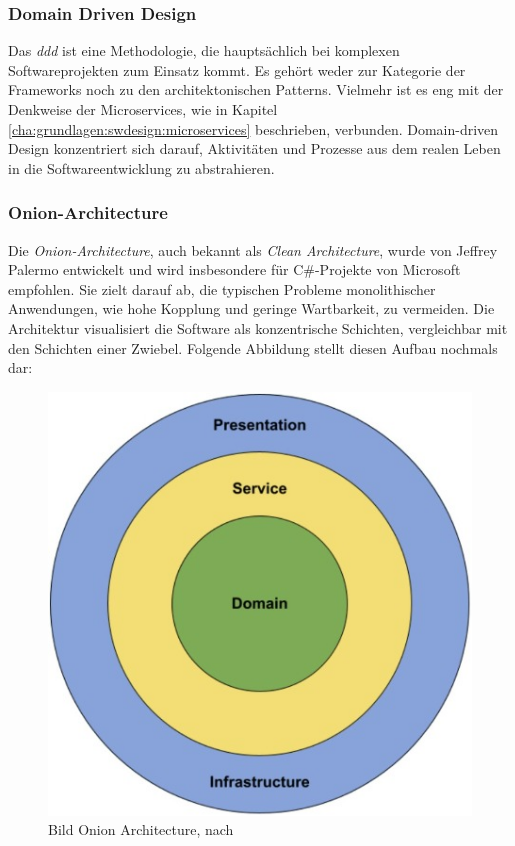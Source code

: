 \subsubsection{Domain Driven Design} \label{cha:grundlagen:swdesign:ddd}

Das \textit{\ac{ddd}} ist eine Methodologie, die hauptsächlich bei komplexen Softwareprojekten zum Einsatz kommt. Es gehört weder zur Kategorie der Frameworks noch zu den architektonischen Patterns. Vielmehr ist es eng mit der Denkweise der Microservices, wie in Kapitel \ref{cha:grundlagen:swdesign:microservices} beschrieben, verbunden. Domain-driven Design konzentriert sich darauf, Aktivitäten und Prozesse aus dem realen Leben in die Softwareentwicklung zu abstrahieren. \autocite{LewisFowler2024}

\subsubsection{Onion-Architecture} \label{cha:grundlagen:swdesign:onion}

Die \textit{Onion-Architecture}, auch bekannt als \textit{Clean Architecture}, wurde von Jeffrey Palermo entwickelt und wird insbesondere für C\#-Projekte von Microsoft empfohlen. Sie zielt darauf ab, die typischen Probleme monolithischer Anwendungen, wie hohe Kopplung und geringe Wartbarkeit, zu vermeiden. Die Architektur visualisiert die Software als konzentrische Schichten, vergleichbar mit den Schichten einer Zwiebel. Folgende Abbildung stellt diesen Aufbau nochmals dar:

\begin{figure}[H]
    \centering
    \includegraphics[width=.65\textwidth]{images/PrAR-Grundlagen-OnionArchitecture.jpeg}
    \caption{Bild Onion Architecture, nach \autocite{CodeMaze2024}}
    \label{fig:grundlagen:swdesign:onion}
\end{figure}

